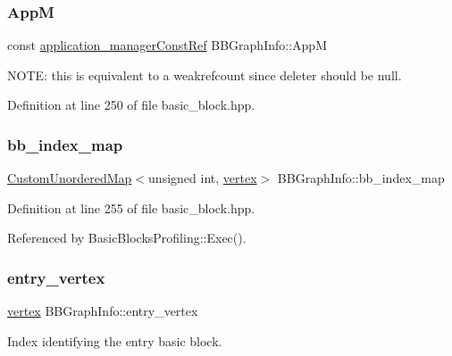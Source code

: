\subsubsection{\texorpdfstring{AppM}{AppM}}
{\footnotesize\ttfamily const \hyperlink{application__manager_8hpp_abb985163a2a3fb747f6f03b1eaadbb44}{application\+\_\+manager\+Const\+Ref} B\+B\+Graph\+Info\+::\+AppM}



N\+O\+TE\+: this is equivalent to a weakrefcount since deleter should be null. 



Definition at line 250 of file basic\+\_\+block.\+hpp.

\mbox{\label{structBBGraphInfo_a4685ad9ee2ceee9d5e88ff1272fcf870}} 
\subsubsection{\texorpdfstring{bb\+\_\+index\+\_\+map}{bb\_index\_map}}
{\footnotesize\ttfamily \hyperlink{custom__map_8hpp_ad1ed68f2ff093683ab1a33522b144adc}{Custom\+Unordered\+Map}$<$unsigned int, \hyperlink{graph_8hpp_abefdcf0544e601805af44eca032cca14}{vertex}$>$ B\+B\+Graph\+Info\+::bb\+\_\+index\+\_\+map}



Definition at line 255 of file basic\+\_\+block.\+hpp.



Referenced by Basic\+Blocks\+Profiling\+::\+Exec().

\mbox{\label{structBBGraphInfo_a10d172f321a87de12a5cd425f37a585b}} 
\subsubsection{\texorpdfstring{entry\+\_\+vertex}{entry\_vertex}}
{\footnotesize\ttfamily \hyperlink{graph_8hpp_abefdcf0544e601805af44eca032cca14}{vertex} B\+B\+Graph\+Info\+::entry\+\_\+vertex}



Index identifying the entry basic block. 



